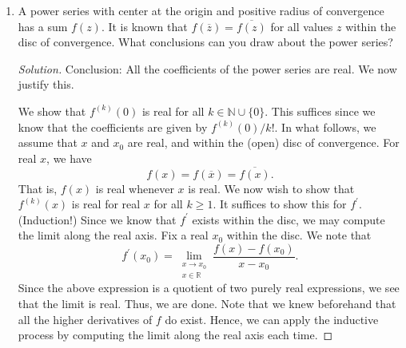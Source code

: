 \documentclass[11pt]{article}
\theoremstyle{definition}
\newenvironment{soln}{\begin{proof}[Solution]}{\end{proof}}
\begin{document}
\begin{enumerate}[leftmargin=*]
\begin{soln}
        Now, we consider the function 
        \[
            f(z) = \frac{z^n}{z^m - 1}
        \]
        defined on $\Omega \vcentcolon= \left\{ z \in\mathbb{C} \mid \abs{z} > 1 \right\}$. For a point satisfying $\abs{z} = R$, we have
        \begin{align*}
            \abs{\frac{z^n}{z^m - 1}} &= \frac{R^n}{\abs{z^m - 1}} \\
            &\leq \frac{R^n}{\abs{\abs{z}^m - 1}} \\
            &= \frac{R^n}{R^m - 1}.
        \end{align*}
        Thus, we may take $M = \dfrac{R^n}{R^m - 1}$. Also, considering $z = R \exp\left( \frac{\iota\pi}{m} \right)$ shows that the inequality is indeed strict at one point. Thus, we may appeal to \textcolor{red}{The Stronger ML Inequality} to conclude that
        \begin{align*}
            \abs{\int_{\abs{z} = R} \frac{z^n}{z^m - 1} \, \mathrm{d}z} &\leq \int_{\abs{z} = R} \abs{\frac{z^n}{z^m - 1}} \, \mathrm{d}z \\
            &< M(2\pi R) \\
            &= \frac{2\pi R^{n+1}}{R^m - 1}. \qedhere
        \end{align*}
    \end{soln}
    
    \item A power series with center at the origin and positive radius of convergence has a sum $f(z)$. It is known that $f(\overline{z}) = \overline{f(z)}$ for all values $z$ within the disc of convergence. What conclusions can you draw about the power series?
    
    \begin{soln}
        Conclusion: All the coefficients of the power series are real. We now justify this.
        
        We show that $f^{(k)}(0)$ is real for all $k \in \mathbb{N} \cup \{0\}$. This suffices since we know that the coefficients are given by $f^{(k)}(0)/k!$. In what follows, we assume that $x$ and $x_0$ are real, and within the (open) disc of convergence. For real $x$, we have
        \[
            f(x) = f(\overline{x}) = \overline{f(x)}.
        \]
        That is, $f(x)$ is real whenever $x$ is real. We now wish to show that $f^{(k)}(x)$ is real for real $x$ for all $k \geq 1$. It suffices to show this for $f^{\prime}$. (Induction!) Since we know that $f^{\prime}$ exists within the disc, we may compute the limit along the real axis. Fix a real $x_0$ within the disc. We note that
        \[
            f^{\prime}(x_0) = \lim_{\substack{x\to x_0 \\ x \in \mathbb{R}}} \frac{f(x) - f(x_0)}{x - x_0}.
        \]
        Since the above expression is a quotient of two purely real expressions, we see that the limit is real. Thus, we are done. Note that we knew beforehand that all the higher derivatives of $f$ do exist. Hence, we can apply the inductive process by computing the limit along the real axis each time.
    \end{soln}
    

\end{enumerate}
\end{document}
